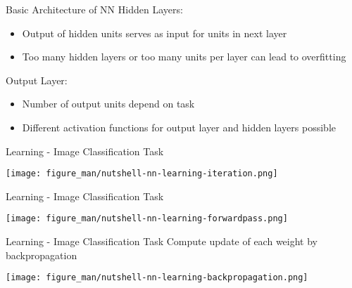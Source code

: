 \documentclass[11pt,compress,t,notes=noshow, xcolor=table]{beamer}
\begin{document}
\begin{vbframe}{Basic Architecture of NN}
Hidden Layers: 
     \begin{itemize}
         \item  Output of hidden units serves as input for units in next layer
         \item Too many hidden layers or too many units per layer can lead to overfitting
     \end{itemize}
Output Layer:
    \begin{itemize}
        \item Number of output units depend on task
        \item Different activation functions for output layer and hidden layers possible
    \end{itemize}

\end{vbframe}

\begin{vbframe}{Learning - Image Classification Task}
\vspace{0.5cm}
\begin{center}
    \texttt{[image: figure\_man/nutshell-nn-learning-iteration.png]}   
\end{center}

\end{vbframe}

\begin{vbframe}{Learning - Image Classification Task}
\vspace{0.5cm}
\begin{center}
   \texttt{[image: figure\_man/nutshell-nn-learning-forwardpass.png]}    
\end{center}
 
\end{vbframe}

\begin{vbframe}{Learning - Image Classification Task}
\small Compute update of each weight by backpropagation
\vspace{0.5cm}
\begin{center}
   \texttt{[image: figure\_man/nutshell-nn-learning-backpropagation.png]}    
\end{center}    
\end{vbframe}
\end{document}
